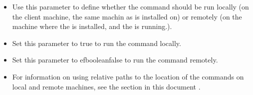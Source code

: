 
\begin{itemize}
\item Use this parameter to define whether the command should be run locally (on the client machine, the same machin as \jb{} is installed on) or remotely (on the machine where the \gdserver{} is installed, and the \gdaut{} is running.). 
\item Set this parameter to true to run the command locally.
\item Set this parameter to \jb{}efbooleanfalse to run the command remotely. 
\item  For information on using relative paths to the location of the commands on local and remote machines, see the section in this document .
\end{itemize}

